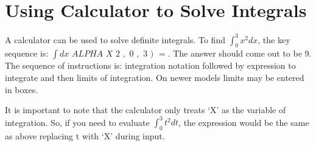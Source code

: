 \documentclass[12pt,a4paper]{article}
\begin{document}
\section{Using Calculator to Solve Integrals}
A calculator can be used to solve definite integrals. To find $\int_{0}^{3}x^2dx$, the key sequence is: $\boxed{\int dx}$ $\boxed{ALPHA}$ $\boxed{X}$ \fbox{\textasciicircum} $\boxed{2}$ $\boxed{,}$ $\boxed{0}$ $\boxed{,}$ $\boxed{3}$ $\boxed{)}$ $\boxed{=}$. The answer should come out to be 9. The sequence of instructions is: integration notation followed by expression to integrate and then limits of integration. On newer models limits may be entered in boxes.

It is important to note that the calculator only treats `X' as the variable of integration. So, if you need to evaluate $\int_{0}^{3}t^2dt$, the expression would be the same as above replacing t with `X' during input.
\end{document}
